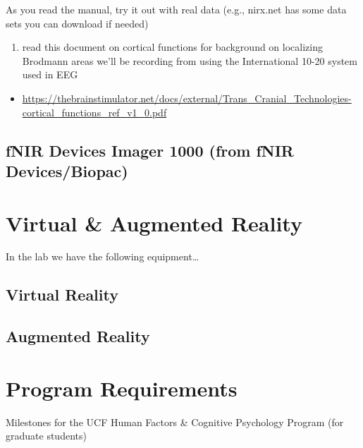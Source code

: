 \documentclass[
]{book}
\providecommand{\tightlist}{%
  \setlength{\itemsep}{0pt}\setlength{\parskip}{0pt}}
\begin{document}
As you read the manual, try it out with real data (e.g., nirx.net has some data sets you can download if needed)

\begin{enumerate}
\def\labelenumi{\arabic{enumi}.}
\setcounter{enumi}{1}
\tightlist
\item
  read this document on cortical functions for background on localizing Brodmann areas we'll be recording from using the International 10-20 system used in EEG
\end{enumerate}

\begin{itemize}
\tightlist
\item
  \url{https://thebrainstimulator.net/docs/external/Trans_Cranial_Technologies-cortical_functions_ref_v1_0.pdf}
\end{itemize}

\hypertarget{fnir-devices-imager-1000-from-fnir-devicesbiopac}{%
\section{fNIR Devices Imager 1000 (from fNIR Devices/Biopac)}\label{fnir-devices-imager-1000-from-fnir-devicesbiopac}}

\hypertarget{virtual-augmented-reality}{%
\chapter{Virtual \& Augmented Reality}\label{virtual-augmented-reality}}

In the lab we have the following equipment\ldots{}

\hypertarget{virtual-reality}{%
\section{Virtual Reality}\label{virtual-reality}}

\hypertarget{augmented-reality}{%
\section{Augmented Reality}\label{augmented-reality}}

\hypertarget{program-requirements}{%
\chapter{Program Requirements}\label{program-requirements}}

Milestones for the UCF Human Factors \& Cognitive Psychology Program (for graduate students)

  
\end{document}
